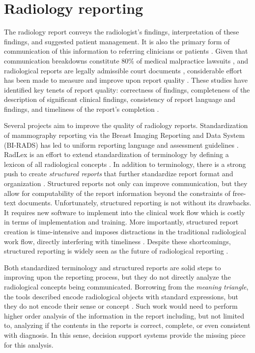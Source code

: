\section{Radiology reporting}
The radiology report conveys the radiologist's findings, interpretation of these findings, and suggested patient management. It is also the primary form of communication of this information to referring clinicians or patients \cite{Sistrom:2005cx}. Given that communication breakdowns constitute 80\% of medical malpractice lawsuits \cite{Levinson:1994ko}, and radiological reports are legally admissible court documents \cite{Oppenheim:2012tq}, considerable effort has been made to measure and improve upon report quality \cite{Langlotz:2015vq}. These studies have identified key tenets of report quality: correctness of findings, completeness of the description of significant clinical findings, consistency of report language and findings, and timeliness of the report's completion \cite{Johnson:2004kh, HaraldO:2004hi, Reiner:2006fa}. 

Several projects aim to improve the quality of radiology reports. Standardization of mammography reporting via the Breast Imaging Reporting and Data System (BI-RADS) has led to uniform reporting language and assessment guidelines \cite{Liberman:ws,Langlotz:2009fn,Burnside:2009ki}. RadLex is an effort to extend standardization of terminology by defining a lexicon of all radiological concepts \cite{Langlotz:2006jn}. In addition to terminology, there is a strong push to create \emph{structured reports} that further standardize report format and organization \cite{Langlotz:2009dd,Reiner:2009ib}. Structured reports not only can improve communication, but they allow for computability of the report information beyond the constraints of free-text documents. Unfortunately, structured reporting is not without its drawbacks. It requires new software to implement into the clinical work flow which is costly in terms of implementation and training. More importantly, structured report creation is time-intensive and imposes distractions in the traditional radiological work flow, directly interfering with timeliness \cite{Weiss:2008er}. Despite these shortcomings, structured reporting is widely seen as the future of radiological reporting \cite{Langlotz:2015vq}.

Both standardized terminology and structured reports are solid steps to improving upon the reporting process, but they do not directly analyze the radiological concepts being communicated. Borrowing from the \emph{meaning triangle}, the tools described encode radiological objects with standard expressions, but they do not encode their sense or concept \cite{Mead:2006wm}. Such work would need to perform higher order analysis of the information in the report including, but not limited to, analyzing if the contents in the reports is correct, complete, or even consistent with diagnosis. In this sense, decision support systems provide the missing piece for this analysis.

